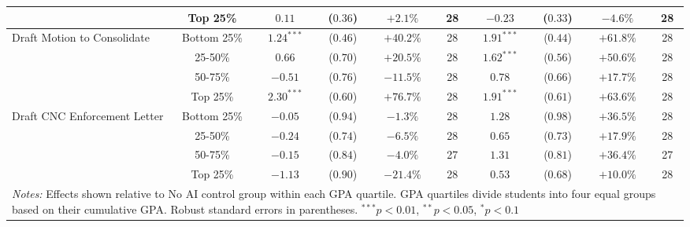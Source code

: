 \begin{table}[!htbp]
\begin{tabular}{lccccccccc}
& Top 25\% & $0.11$ & ($0.36$) & $+2.1\%$ & 28 & $-0.23$ & ($0.33$) & $-4.6\%$ & 28 \\
\hline
\multirow{4}{*}{Draft Motion to Consolidate} & Bottom 25\% & $1.24^{***}$ & ($0.46$) & $+40.2\%$ & 28 & $1.91^{***}$ & ($0.44$) & $+61.8\%$ & 28 \\
& 25-50\% & $0.66$ & ($0.70$) & $+20.5\%$ & 28 & $1.62^{***}$ & ($0.56$) & $+50.6\%$ & 28 \\
& 50-75\% & $-0.51$ & ($0.76$) & $-11.5\%$ & 28 & $0.78$ & ($0.66$) & $+17.7\%$ & 28 \\
& Top 25\% & $2.30^{***}$ & ($0.60$) & $+76.7\%$ & 28 & $1.91^{***}$ & ($0.61$) & $+63.6\%$ & 28 \\
\hline
\multirow{4}{*}{Draft CNC Enforcement Letter} & Bottom 25\% & $-0.05$ & ($0.94$) & $-1.3\%$ & 28 & $1.28$ & ($0.98$) & $+36.5\%$ & 28 \\
& 25-50\% & $-0.24$ & ($0.74$) & $-6.5\%$ & 28 & $0.65$ & ($0.73$) & $+17.9\%$ & 28 \\
& 50-75\% & $-0.15$ & ($0.84$) & $-4.0\%$ & 27 & $1.31$ & ($0.81$) & $+36.4\%$ & 27 \\
& Top 25\% & $-1.13$ & ($0.90$) & $-21.4\%$ & 28 & $0.53$ & ($0.68$) & $+10.0\%$ & 28 \\
\hline
\multicolumn{10}{p{0.95\linewidth}}{\footnotesize \textit{Notes:} Effects shown relative to No AI control group within each GPA quartile. GPA quartiles divide students into four equal groups based on their cumulative GPA. Robust standard errors in parentheses. $^{***}p<0.01$, $^{**}p<0.05$, $^{*}p<0.1$}
\end{tabular}
\end{table}
